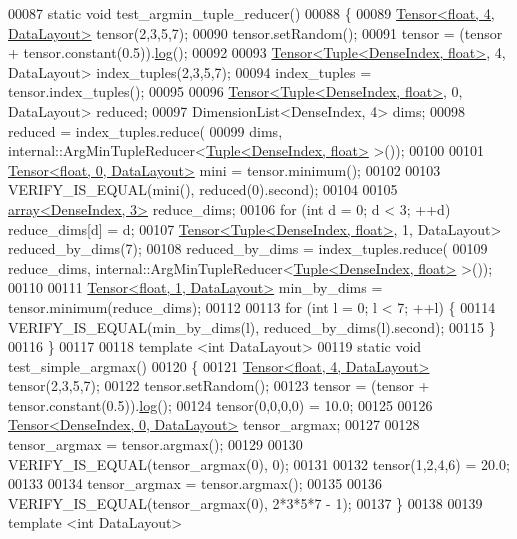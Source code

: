 \begin{DoxyCode}
00087 \textcolor{keyword}{static} \textcolor{keywordtype}{void} test\_argmin\_tuple\_reducer()
00088 \{
00089   \hyperlink{class_eigen_1_1_tensor}{Tensor<float, 4, DataLayout>} tensor(2,3,5,7);
00090   tensor.setRandom();
00091   tensor = (tensor + tensor.constant(0.5)).\hyperlink{structlog}{log}();
00092 
00093   \hyperlink{class_eigen_1_1_tensor}{Tensor<Tuple<DenseIndex, float>}, 4, DataLayout> index\_tuples(2,3,5,7);
00094   index\_tuples = tensor.index\_tuples();
00095 
00096   \hyperlink{class_eigen_1_1_tensor}{Tensor<Tuple<DenseIndex, float>}, 0, DataLayout> reduced;
00097   DimensionList<DenseIndex, 4> dims;
00098   reduced = index\_tuples.reduce(
00099       dims, internal::ArgMinTupleReducer<\hyperlink{struct_eigen_1_1_tuple}{Tuple<DenseIndex, float>} >());
00100 
00101   \hyperlink{class_eigen_1_1_tensor}{Tensor<float, 0, DataLayout>} mini = tensor.minimum();
00102 
00103   VERIFY\_IS\_EQUAL(mini(), reduced(0).second);
00104 
00105   \hyperlink{class_eigen_1_1array}{array<DenseIndex, 3>} reduce\_dims;
00106   \textcolor{keywordflow}{for} (\textcolor{keywordtype}{int} d = 0; d < 3; ++d) reduce\_dims[d] = d;
00107   \hyperlink{class_eigen_1_1_tensor}{Tensor<Tuple<DenseIndex, float>}, 1, DataLayout> reduced\_by\_dims(7);
00108   reduced\_by\_dims = index\_tuples.reduce(
00109       reduce\_dims, internal::ArgMinTupleReducer<\hyperlink{struct_eigen_1_1_tuple}{Tuple<DenseIndex, float>} >());
00110 
00111   \hyperlink{class_eigen_1_1_tensor}{Tensor<float, 1, DataLayout>} min\_by\_dims = tensor.minimum(reduce\_dims);
00112 
00113   \textcolor{keywordflow}{for} (\textcolor{keywordtype}{int} l = 0; l < 7; ++l) \{
00114     VERIFY\_IS\_EQUAL(min\_by\_dims(l), reduced\_by\_dims(l).second);
00115   \}
00116 \}
00117 
00118 \textcolor{keyword}{template} <\textcolor{keywordtype}{int} DataLayout>
00119 \textcolor{keyword}{static} \textcolor{keywordtype}{void} test\_simple\_argmax()
00120 \{
00121   \hyperlink{class_eigen_1_1_tensor}{Tensor<float, 4, DataLayout>} tensor(2,3,5,7);
00122   tensor.setRandom();
00123   tensor = (tensor + tensor.constant(0.5)).\hyperlink{structlog}{log}();
00124   tensor(0,0,0,0) = 10.0;
00125 
00126   \hyperlink{class_eigen_1_1_tensor}{Tensor<DenseIndex, 0, DataLayout>} tensor\_argmax;
00127 
00128   tensor\_argmax = tensor.argmax();
00129 
00130   VERIFY\_IS\_EQUAL(tensor\_argmax(0), 0);
00131 
00132   tensor(1,2,4,6) = 20.0;
00133 
00134   tensor\_argmax = tensor.argmax();
00135 
00136   VERIFY\_IS\_EQUAL(tensor\_argmax(0), 2*3*5*7 - 1);
00137 \}
00138 
00139 \textcolor{keyword}{template} <\textcolor{keywordtype}{int} DataLayout>

\end{DoxyCode}

